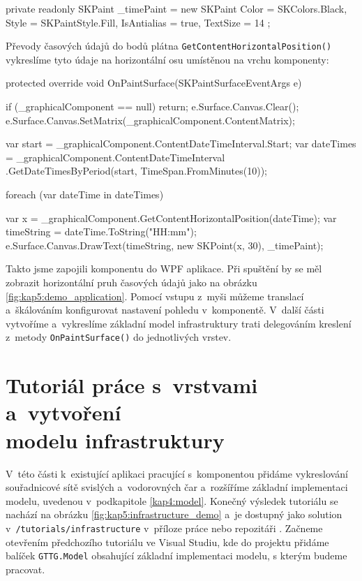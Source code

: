 \begin{csharpcode}
private readonly SKPaint _timePaint = 
	new SKPaint { Color = SKColors.Black,
				  Style = SKPaintStyle.Fill,
				  IsAntialias = true, TextSize = 14 };
\end{csharpcode}

Převody časových údajů do bodů plátna \texttt{GetContentHorizontalPosition()} vykreslíme tyto údaje na horizontální osu umístěnou na vrchu komponenty:
\begin{csharpcode}
protected override void OnPaintSurface(SKPaintSurfaceEventArgs e) {

	if (_graphicalComponent == null) return;
	e.Surface.Canvas.Clear();
	e.Surface.Canvas.SetMatrix(_graphicalComponent.ContentMatrix);
            
	var start = _graphicalComponent.ContentDateTimeInterval.Start; 
	var dateTimes = _graphicalComponent.ContentDateTimeInterval
				    .GetDateTimesByPeriod(start, TimeSpan.FromMinutes(10));	
	
	foreach (var dateTime in dateTimes) {

		var x = _graphicalComponent.GetContentHorizontalPosition(dateTime);
		var timeString = dateTime.ToString("HH:mm");
		e.Surface.Canvas.DrawText(timeString, new SKPoint(x, 30), _timePaint);
	}
}
\end{csharpcode}

Takto jsme zapojili komponentu do WPF aplikace. Při spuštění by se měl zobrazit horizontální pruh časových údajů jako na obrázku \ref{fig:kap5:demo_application}. Pomocí vstupu z~myši můžeme translací a~škálováním konfigurovat nastavení pohledu v~komponentě. V~další části vytvoříme a~vykreslíme základní model infrastruktury trati delegováním kreslení z~metody \texttt{OnPaintSurface()} do jednotlivých vrstev.

\newpage
\section[Tutoriál práce s~vrstvami a~vytvoření modelu infrastruktury]{Tutoriál práce s~vrstvami a~vytvoření \\modelu infrastruktury}
V~této části k~existující aplikaci pracující s~komponentou přidáme vykreslování souřadnicové sítě svislých a~vodorovných čar a~rozšíříme základní implementaci modelu, uvedenou v~podkapitole \ref{kap4:model}. Konečný výsledek tutoriálu se nachází na obrázku \ref{fig:kap5:infrastructure_demo} a~je dostupný jako solution v~\texttt{/tutorials/infrastructure} v~příloze práce nebo repozitáři \cite{GTTG.Tutorials.Infrastructure}. Začneme otevřením předchozího tutoriálu ve Visual Studiu, kde do projektu přidáme balíček \texttt{GTTG.Model} obsahující základní implementaci modelu, s kterým budeme pracovat.

